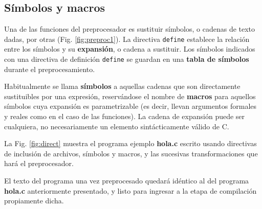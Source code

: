 \subsection{Símbolos y macros}
Una de las funciones del preprocesador es sustituir símbolos, o cadenas de texto dadas, por otras 
(Fig. \ref{fig:preproc1}). La directiva \lstinline{define} establece la relación entre los símbolos y su \textbf{expansión}, o cadena 
a sustituir. Los símbolos indicados con una directiva de definición \lstinline{define} se guardan en una \textbf{tabla de símbolos} durante el preprocesamiento. 

Habitualmente se llama \textbf{símbolos} a aquellas cadenas que son directamente sustituibles por una expresión, reservándose el nombre de \textbf{macros} para aquellos símbolos cuya expansión es parametrizable (es decir, llevan argumentos formales y reales como en el caso de las funciones). La cadena de expansión puede ser cualquiera, no necesariamente un elemento sintácticamente válido de C.


\begin{ejemplo}
La Fig. \ref{fig:direct} muestra el programa ejemplo \textbf{hola.c} escrito usando directivas de inclusión de archivos, símbolos y macros, y las sucesivas transformaciones que hará el preprocesador. 

El texto del programa una vez preprocesado quedará idéntico al del programa \textbf{hola.c} anteriormente presentado, y listo para ingresar a la etapa de compilación propiamente dicha. 
\end{ejemplo}


